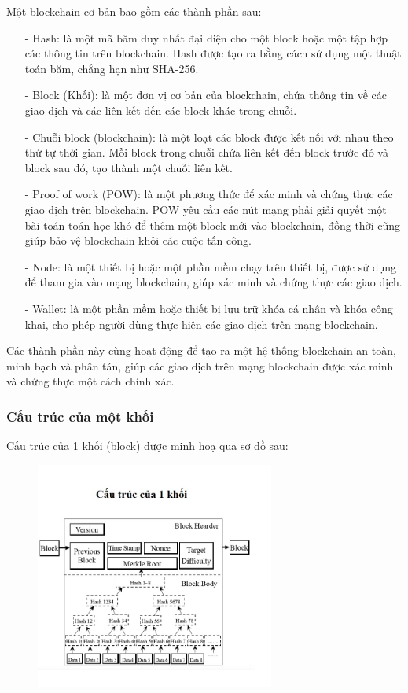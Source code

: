Một blockchain cơ bản bao gồm các thành phần sau:
\begin{itemize}
    \item[-] Hash: là một mã băm duy nhất đại diện cho một block hoặc một tập hợp các thông tin trên blockchain. Hash được tạo ra bằng cách sử dụng một thuật toán băm, chẳng hạn như SHA-256.
    \item[-] Block (Khối): là một đơn vị cơ bản của blockchain, chứa thông tin về các giao dịch và các liên kết đến các block khác trong chuỗi.
    \item[-] Chuỗi block (blockchain): là một loạt các block được kết nối với nhau theo thứ tự thời gian. Mỗi block trong chuỗi chứa liên kết đến block trước đó và block sau đó, tạo thành một chuỗi liên kết.
    \item[-] Proof of work (POW): là một phương thức để xác minh và chứng thực các giao dịch trên blockchain. POW yêu cầu các nút mạng phải giải quyết một bài toán toán học khó để thêm một block mới vào blockchain, đồng thời cũng giúp bảo vệ blockchain khỏi các cuộc tấn công.
    \item[-] Node: là một thiết bị hoặc một phần mềm chạy trên thiết bị, được sử dụng để tham gia vào mạng blockchain, giúp xác minh và chứng thực các giao dịch.
    \item[-] Wallet: là một phần mềm hoặc thiết bị lưu trữ khóa cá nhân và khóa công khai, cho phép người dùng thực hiện các giao dịch trên mạng blockchain.

\end{itemize}


Các thành phần này cùng hoạt động để tạo ra một hệ thống blockchain an toàn, minh bạch và phân tán, giúp các giao dịch trên mạng blockchain được xác minh và chứng thực một cách chính xác.

\subsubsection{Cấu trúc của một khối}


Cấu trúc của 1 khối (block) được minh hoạ qua sơ đồ sau:
\begin{figure}[h]
    \centering
    \includegraphics[width=0.7\textwidth]{images/Cau_truc_khoi.png}
    \label{fig:cau_truc_khoi}
    \caption{}
\end{figure}

